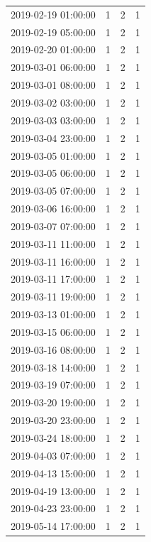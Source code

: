 \begin{tabular}{lrrr}
2019-02-19 01:00:00 & 1 & 2 & 1 \\
2019-02-19 05:00:00 & 1 & 2 & 1 \\
2019-02-20 01:00:00 & 1 & 2 & 1 \\
2019-03-01 06:00:00 & 1 & 2 & 1 \\
2019-03-01 08:00:00 & 1 & 2 & 1 \\
2019-03-02 03:00:00 & 1 & 2 & 1 \\
2019-03-03 03:00:00 & 1 & 2 & 1 \\
2019-03-04 23:00:00 & 1 & 2 & 1 \\
2019-03-05 01:00:00 & 1 & 2 & 1 \\
2019-03-05 06:00:00 & 1 & 2 & 1 \\
2019-03-05 07:00:00 & 1 & 2 & 1 \\
2019-03-06 16:00:00 & 1 & 2 & 1 \\
2019-03-07 07:00:00 & 1 & 2 & 1 \\
2019-03-11 11:00:00 & 1 & 2 & 1 \\
2019-03-11 16:00:00 & 1 & 2 & 1 \\
2019-03-11 17:00:00 & 1 & 2 & 1 \\
2019-03-11 19:00:00 & 1 & 2 & 1 \\
2019-03-13 01:00:00 & 1 & 2 & 1 \\
2019-03-15 06:00:00 & 1 & 2 & 1 \\
2019-03-16 08:00:00 & 1 & 2 & 1 \\
2019-03-18 14:00:00 & 1 & 2 & 1 \\
2019-03-19 07:00:00 & 1 & 2 & 1 \\
2019-03-20 19:00:00 & 1 & 2 & 1 \\
2019-03-20 23:00:00 & 1 & 2 & 1 \\
2019-03-24 18:00:00 & 1 & 2 & 1 \\
2019-04-03 07:00:00 & 1 & 2 & 1 \\
2019-04-13 15:00:00 & 1 & 2 & 1 \\
2019-04-19 13:00:00 & 1 & 2 & 1 \\
2019-04-23 23:00:00 & 1 & 2 & 1 \\
2019-05-14 17:00:00 & 1 & 2 & 1 \\
\bottomrule
\end{tabular}

